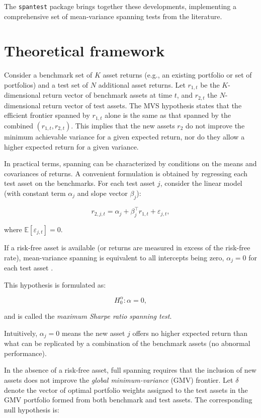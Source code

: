 The \texttt{spantest} package brings together these developments, implementing
a comprehensive set of mean-variance spanning tests from the literature.

\section{Theoretical framework}\label{theoretical-framework}

Consider a benchmark set of \(K\) asset returns (e.g., an existing
portfolio or set of portfolios) and a test set of \(N\) additional asset
returns. Let \(r_{1,t}\) be the \(K\)-dimensional return vector of benchmark
assets at time \(t\), and \(r_{2,t}\) the \(N\)-dimensional return vector of
test assets. The MVS hypothesis states that the efficient frontier
spanned by \(r_{1,t}\) alone is the same as that spanned by the combined
\((r_{1,t}, r_{2,t})\). This implies that the new assets \(r_2\) do not
improve the minimum achievable variance for a given expected return, nor
do they allow a higher expected return for a given variance.

In practical terms, spanning can be characterized by conditions on the
means and covariances of returns. A convenient formulation is obtained
by regressing each test asset on the benchmarks. For each test asset
\(j\), consider the linear model (with constant term \(\alpha_j\) and slope
vector \(\beta_j\)):

\[
r_{2,j,t} = \alpha_j + \beta_j^\top r_{1,t} + \varepsilon_{j,t},
\]

where \(\mathbb{E}[\varepsilon_{j,t}] = 0\).

If a risk-free asset is available (or returns are measured in excess of
the risk-free rate), mean-variance spanning is equivalent to all
intercepts being zero, \(\alpha_j = 0\) for each test asset
\citep{PesaranYamagata2023}.

This hypothesis is formulated as:

\[
H_0^\alpha: \alpha = 0,
\]

and is called the \emph{maximum Sharpe ratio spanning test}.

Intuitively, \(\alpha_j = 0\) means the new asset \(j\) offers no higher
expected return than what can be replicated by a combination of the
benchmark assets (no abnormal performance).

In the absence of a risk-free asset, full spanning requires that the
inclusion of new assets does not improve the \emph{global minimum-variance}
(GMV) frontier. Let \(\delta\) denote the vector of optimal portfolio
weights assigned to the test assets in the GMV portfolio formed from
both benchmark and test assets. The corresponding null hypothesis is:

